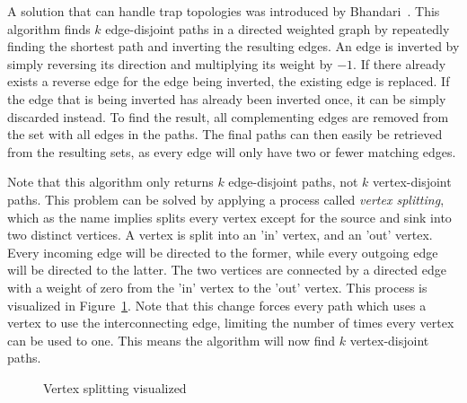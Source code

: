 A solution that can handle trap topologies was introduced by Bhandari~\cite{bhandari}. This algorithm finds $k$ edge-disjoint paths in a directed weighted graph by repeatedly finding the shortest path and inverting the resulting edges. An edge is inverted by simply reversing its direction and multiplying its weight by $-1$. If there already exists a reverse edge for the edge being inverted, the existing edge is replaced. If the edge that is being inverted has already been inverted once, it can be simply discarded instead.
To find the result, all complementing edges are removed from the set with all edges in the paths. The final paths can then easily be retrieved from the resulting sets, as every edge will only have two or fewer matching edges.

Note that this algorithm only returns $k$ edge-disjoint paths, not $k$ vertex-disjoint paths. This problem can be solved by applying a process called \textit{vertex splitting}, which as the name implies splits every vertex except for the source and sink into two distinct vertices. 
A vertex is split into an 'in' vertex, and an 'out' vertex. Every incoming edge will be directed to the former, while every outgoing edge will be directed to the latter. The two vertices are connected by a directed edge with a weight of zero from the 'in' vertex to the 'out' vertex. This process is visualized in Figure~\ref{contr:node-splitting}. Note that this change forces every path which uses a vertex to use the interconnecting edge, limiting the number of times every vertex can be used to one. This means the algorithm will now find $k$ vertex-disjoint paths.

\vspace{-0.12in}
\begin{figure}[h]
    \centering
    \caption{Vertex splitting visualized}
    \label{contr:node-splitting}
\end{figure}
\vspace{-0.12in}


